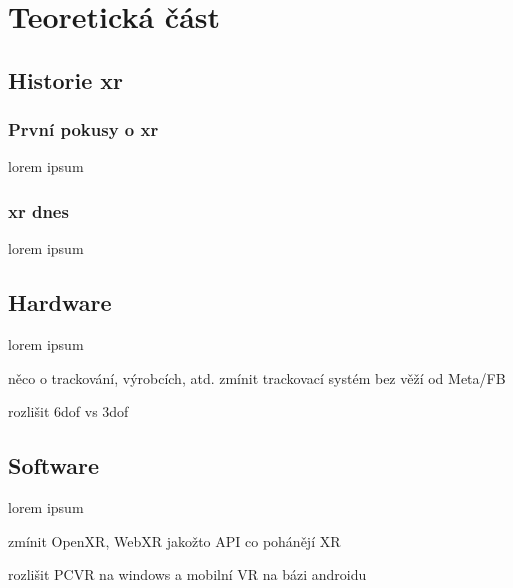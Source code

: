 \part{Teoretická část}

\chapter{Historie \gls{xr}}

\section{První pokusy o \gls{xr}}

lorem ipsum

\section{\gls{xr} dnes}

lorem ipsum

\chapter{Hardware}
lorem ipsum

něco o trackování, výrobcích, atd. zmínit trackovací systém bez věží od Meta/FB

rozlišit 6dof vs 3dof

\chapter{Software}
lorem ipsum

zmínit OpenXR, WebXR jakožto API co pohánějí XR

rozlišit PCVR na windows a mobilní VR na bázi androidu